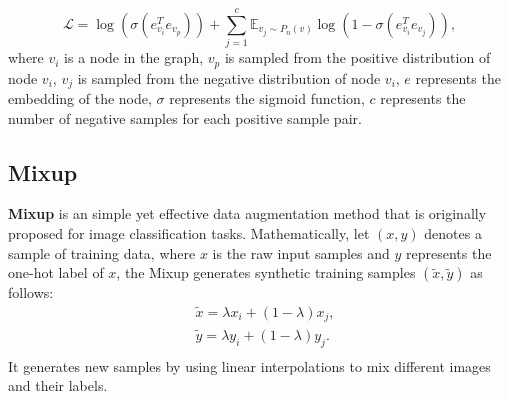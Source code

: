\begin{equation}\label{negsampling}
    \mathcal{L} = \log(\sigma (e_{v_i}^Te_{v_p}))+\sum^{c}_{j=1}\mathbb{E}_{v_j\sim P_n(v)}  \log(1-\sigma (e_{v_i}^Te_{v_j})),
\end{equation}
where $v_i$ is a node in the graph, $v_p$ is sampled from the positive distribution of node $v_i$, $v_j$ is sampled from the negative distribution of node $v_i$, $e$ represents the embedding of the node, $\sigma$ represents the sigmoid function, $c$ represents the number of negative samples for each positive sample pair. 


\subsection{Mixup}


\textbf{Mixup\cite{mixup}} is an simple yet effective data augmentation method that is originally proposed for image classification tasks. 
Mathematically, let $(x, y)$ denotes a sample of training data, where $x$ is the raw input samples and $y$ represents the one-hot label of $x$, the Mixup generates synthetic training samples $(\tilde{x}, \tilde{y})$  as follows:
\begin{equation}
\begin{split}
& \tilde{x}=\lambda x_{i}+(1-\lambda) x_{j}, \\
& \tilde{y}=\lambda y_{i}+(1-\lambda) y_{j}. \\
\end{split}
\end{equation}
It generates new samples by using linear interpolations to mix different images and their labels.